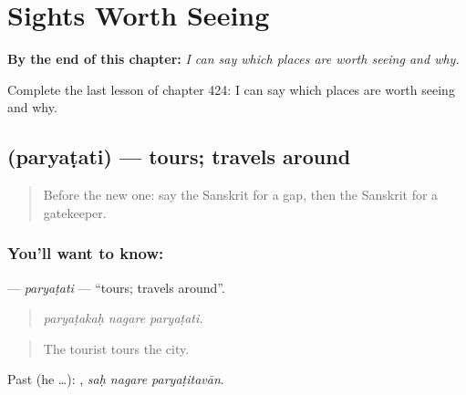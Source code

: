 
\chapter{Sights Worth Seeing}
\label{ch:sa-sights-worth-seeing}

\begin{chapteropening}
\textbf{By the end of this chapter:} \emph{I can say which places are worth seeing and why.}

Complete the last lesson of chapter 424: I can say which places are worth seeing and why.
\end{chapteropening}

\section[\texorpdfstring{\sk{पर्यटति} (paryaṭati)}{पर्यटति (paryaṭati)}]{ (paryaṭati) — tours; travels around}

\label{lesson:SA-C424-paryatati}



\begin{quote}
Before the new one: say the Sanskrit for a gap, then the Sanskrit for a gatekeeper.
\end{quote}

\subsection*{You'll want to know: }
\textbf{} — \emph{paryaṭati} — \textquotedblleft{}tours; travels around\textquotedblright{}.

\begin{quote}
  
\end{quote}

\begin{quote}
\emph{paryaṭakaḥ nagare paryaṭati.}
\end{quote}

\begin{quote}
The tourist tours the city.
\end{quote}

Past (he …):   , \emph{saḥ nagare paryaṭitavān}.

